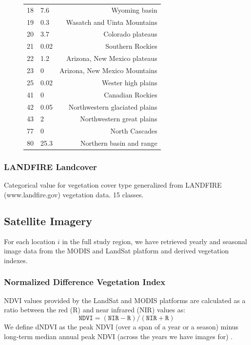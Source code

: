 \def\year{2017}\relax \documentclass[letterpaper]{article}
\begin{document}
\begin{figure}
\begin{minipage}[b]{0.49\textwidth}
\begin{tabularx}{\linewidth}{l l r}
		18&7.6&Wyoming basin\\
		19&0.3&Wasatch and Uinta Mountains\\
		20&3.7&Colorado plateaus\\
		21&0.02&Southern Rockies\\
		22&1.2&Arizona, New Mexico plateaus\\
		23&0&Arizona, New Mexico Mountains\\
		25&0.02&Wester high plains\\
		41&0&Canadian Rockies\\
		42&0.05&Northwestern glaciated plains\\
		43&2&Northwestern great plains\\
		77&0&North Cascades\\
		80&25.3&Northern basin and range\\ 
		\bottomrule[.2em]
	\end{tabularx}
      \label{tab:ecomap}
    \end{minipage}

  \end{figure}

\subsubsection{LANDFIRE Landcover}
Categorical value for vegetation cover type generalized from LANDFIRE (www.landfire.gov) vegetation data. 15 classes.\\
\subsection{Satellite Imagery}\label{sat} For each location $i$ in the full study region, we have retrieved yearly and seasonal image data from the MODIS and LandSat platform and derived vegetation indexes.
\subsubsection{Normalized Difference Vegetation Index}
NDVI values provided by the LandSat \cite{usgs2014landsat} and MODIS platforms are calculated as a ratio between the red (R) and near infrared (NIR) values as:
\begin{equation}
\texttt{NDVI} = (\texttt{NIR} - \texttt{R}) / (\texttt{NIR} + \texttt{R})
\end{equation}
We define dNDVI as the peak NDVI (over a span of a year or a season) minus long-term median annual peak NDVI (across the years we have images for) .
\end{document}
